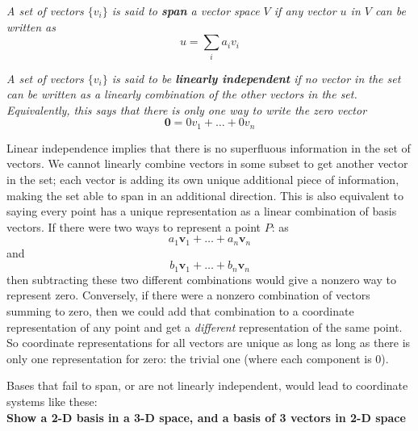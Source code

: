 \begin{definition}
	\textit{A set of vectors $\{v_i\}$ is said to \textbf{span} a vector space $V$ if any vector $u$ in $V$ can be written as} 
	\begin{equation*}
		u = \sum\limits_i a_iv_i
	\end{equation*}
\end{definition}
\begin{definition}
	\textit{A set of vectors $\{v_i\}$ is said to be \textbf{linearly independent} if no vector in the set can be written as a linearly combination of the other vectors in the set.  Equivalently, this says that there is only one way to write the zero vector} 
	\begin{equation*}
		\mathbf 0 =  0v_1 +\dots + 0v_n
	\end{equation*}
\end{definition}
	
	Linear independence implies that there is no superfluous information in the set of vectors.  We cannot linearly combine vectors in some subset to get another vector in the set; each vector is adding its own unique additional piece of information, making the set able to span in an additional direction. This is also equivalent to saying every point has a unique representation as a linear combination of basis vectors. If there were two ways to represent a point $P$: as \begin{equation*}
		a_1 \mathbf v_1 + \dots + a_n \mathbf v_n
	\end{equation*} 
	and 
	\begin{equation*}
		b_1 \mathbf v_1 + \dots + b_n \mathbf v_n
	\end{equation*} 
	then subtracting these two different combinations would give a nonzero way to represent zero. Conversely, if there were a nonzero combination of vectors summing to zero, then we could add that combination to a coordinate representation of any point and get a \emph{different} representation of the same point. So coordinate representations for all vectors are unique as long as long as there is only one representation for zero: the trivial one (where each component is 0).
	
	Bases that fail to span, or are not linearly independent, would lead to coordinate systems like these:\\
	
	\textbf{Show a 2-D basis in a 3-D space, and a basis of 3 vectors in 2-D space}\\


